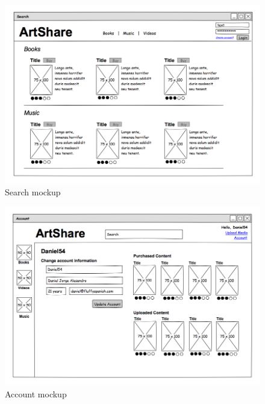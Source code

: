 \documentclass[../report.tex]{subfiles}
\begin{document}
\graphicspath{{img/}{../img/}}


\begin{figure}[H]
\centering
\includegraphics[scale=0.4]{mockups/search.png}
\caption{Search mockup}
\end{figure}

\begin{figure}[H]
\centering
\includegraphics[scale=0.4]{mockups/account.png}
\caption{Account mockup}
\end{figure}
\end{document}
